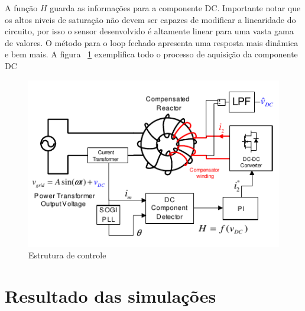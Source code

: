 \documentclass[paper=a4, fontsize=11pt]{article}
\begin{document}
A função $H$ guarda as informações para a componente DC. Importante notar que os 
altos niveis de saturação não devem ser capazes de modificar a linearidade do 
circuito, por isso o sensor desenvolvido é altamente linear para uma vasta gama 
de valores. O método para o loop fechado apresenta uma resposta mais dinâmica e 
bem mais. A figura ~\ref{fig:figura4} exemplifica todo o processo de aquisição 
da componente DC

\begin{figure}[!ht]
	\centering
	\includegraphics[scale=.8]{fig4.png}
    \caption{Estrutura de controle}
    \label{fig:figura4}
\end{figure}

\section{Resultado das simulações}
\end{document}
